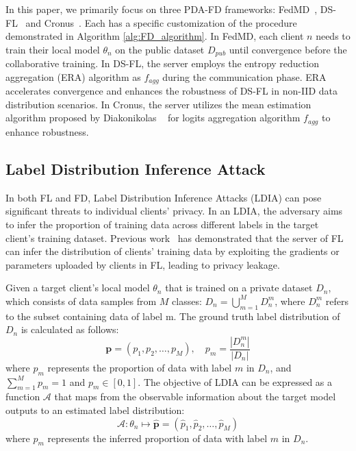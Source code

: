 In this paper, we primarily focus on three PDA-FD frameworks: FedMD~\cite{li2019fedmd}, DS-FL~\cite{itahara2021distillation} and Cronus~\cite{chang2019cronus}. 
Each has a specific customization of the procedure demonstrated in Algorithm \ref{alg:FD_algorithm}.
In FedMD, each client $n$ needs to train their local model $\theta_{n}$ on the public dataset $D_{pub}$ until convergence before the collaborative training.
In DS-FL, the server employs the entropy reduction aggregation (ERA)\cite{itahara2021distillation} algorithm as $f_{agg}$ during the communication phase. 
ERA accelerates convergence and enhances the robustness of DS-FL in non-IID data distribution scenarios.
In Cronus, the server utilizes the mean estimation algorithm proposed by Diakonikolas \etal~\cite{diakonikolas2017being} for logits aggregation algorithm $f_{agg}$ to enhance robustness.


\subsection{Label Distribution Inference Attack}
In both FL and FD, Label Distribution Inference Attacks (LDIA) can pose significant threats to individual clients' privacy.
In an LDIA, the adversary aims to infer the proportion of training data across different labels in the target client’s training dataset.
Previous work~\cite{gu2023ldia, wainakh2021user} has demonstrated that the server of FL can infer the distribution of clients' training data by exploiting the gradients or parameters uploaded by clients in FL, leading to privacy leakage.

Given a target client's local model $\theta_{n}$ that is trained on a private dataset $D_{n}$, which consists of data samples from $M$ classes: $D_n = \bigcup_{m=1}^{M} D_n^m$, where $D_n^m$ refers to the subset containing data of label m.
The ground truth label distribution of $D_{n}$ is calculated as follows:
\begin{equation}
    \mathbf{p} = \left( p_1, p_2, \dots, p_M \right), \quad p_m = \frac{|D_n^m|}{|D_n|}
\end{equation}
where $p_m$ represents the proportion of data with label $m$ in $D_{n}$, and $\sum_{m=1}^{M} p_m = 1$ and $p_m \in [0,1]$.
The objective of LDIA can be expressed as a function $\mathcal{A}$ that maps from the observable information about the target model outputs to an estimated label distribution:
\begin{equation}
    \mathcal{A} : \theta_n \mapsto \mathbf{\hat{p}} = \left( \hat{p}_1, \hat{p}_2, \dots, \hat{p}_M \right)
\end{equation}
where $\hat{p}_m$ represents the inferred proportion of data with label $m$ in $D_{n}$. 

